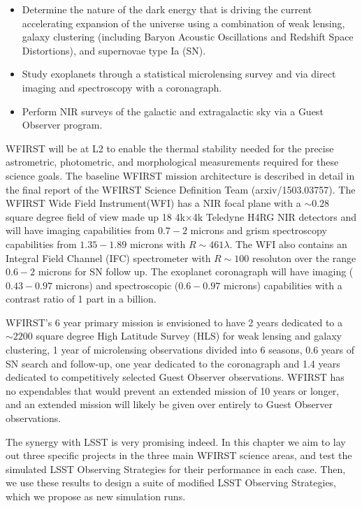 \begin{itemize}
\item Determine the nature of the dark energy that is driving the
current accelerating expansion of the universe using a combination of
weak lensing, galaxy clustering (including Baryon Acoustic Oscillations
and Redshift Space Distortions), and supernovae type Ia (SN).
\item Study exoplanets through a statistical microlensing survey and via
direct imaging and spectroscopy with a coronagraph.
\item Perform NIR surveys of the galactic and extragalactic sky via a
Guest Observer program.
\end{itemize}

WFIRST will be at L2 to enable the thermal stability needed for the
precise astrometric, photometric, and morphological measurements
required for these science goals. The baseline WFIRST mission
architecture is described in detail in the final report of the WFIRST
Science Definition Team (arxiv/1503.03757). The WFIRST Wide Field
Instrument(WFI) has a NIR focal plane with a $\sim0.28$ square degree
field of view made up 18 4k$\times$4k Teledyne H4RG NIR detectors and will
have imaging capabilities from $0.7-2$ microns and grism spectroscopy
capabilities from $1.35-1.89$ microns with $R\sim461\lambda$.  The WFI
also contains an Integral Field Channel (IFC) spectrometer with $R\sim100$
resoluton over the range $0.6-2$ microns for SN follow up. The exoplanet
coronagraph will have imaging ($0.43-0.97$ microns) and spectroscopic
($0.6-0.97 $ microns) capabilities with a contrast ratio of 1 part in a
billion.

WFIRST's  6 year primary mission is envisioned to have 2 years dedicated to a
$\sim2200$ square degree High Latitude Survey (HLS) for weak lensing and
galaxy clustering,  1 year of microlensing observations divided into 6
seasons, $0.6$ years of SN search and follow-up, one year dedicated to
the coronagraph and 1.4 years dedicated to competitively selected Guest
Observer observations. WFIRST has no expendables that would prevent an
extended mission of 10 years or longer, and an extended mission will likely be
given over entirely to Guest Observer observations.

The synergy with LSST is very promising indeed. In this chapter we aim
to  lay out three  specific projects in the three main WFIRST science
areas, and test the simulated LSST Observing
Strategies for their performance in each case. Then, we use these
results to design a suite of modified LSST Observing Strategies, which
we propose as new \OpSim simulation runs.



